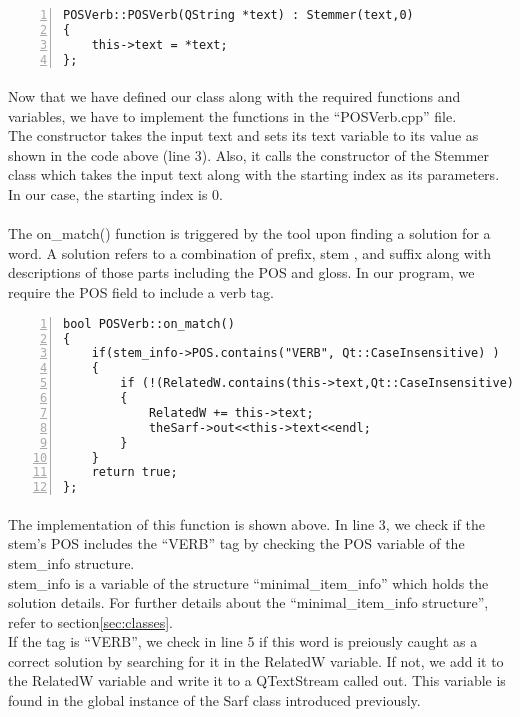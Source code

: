 \documentclass{article}
\begin{document}
\begin{Verbatim}[numbers=left]
POSVerb::POSVerb(QString *text) : Stemmer(text,0)
{
    this->text = *text;
};
\end{Verbatim}

\paragraph{}
Now that we have defined our class along with the required functions and variables, we have to implement the functions in the ``POSVerb.cpp'' file.\\
The constructor takes the input text and sets its text variable to its value as shown in the code above (line 3). Also, it calls the constructor of the Stemmer class which takes the input text along with the starting index as its parameters. In our case, the starting index is 0.

\paragraph{}
The on\_match() function is triggered by the tool upon finding a solution for a word. A solution refers to a combination of prefix, stem , and suffix along with descriptions of those parts including the POS and gloss. In our program, we require the POS field to include a verb tag.

\begin{Verbatim}[numbers=left]
bool POSVerb::on_match()
{
    if(stem_info->POS.contains("VERB", Qt::CaseInsensitive) )
    {
        if (!(RelatedW.contains(this->text,Qt::CaseInsensitive)))
        {
            RelatedW += this->text;
            theSarf->out<<this->text<<endl;
        }
    }
    return true;
};
\end{Verbatim}

\paragraph{}
The implementation of this function is shown above. In line 3, we check if the stem's POS includes the ``VERB'' tag by checking the POS variable of the stem\_info structure.\\

stem\_info is a variable of the structure ``minimal\_item\_info'' which holds the solution details. For further details about the ``minimal\_item\_info structure'', refer to section\ref{sec:classes}.\\

If the tag is ``VERB'', we check in line 5 if this word is preiously caught as a correct solution by searching for it in the RelatedW variable. If not, we add it to the RelatedW variable and write it to a QTextStream called out. This variable is found in the global instance of the Sarf class introduced previously.
\end{document}
